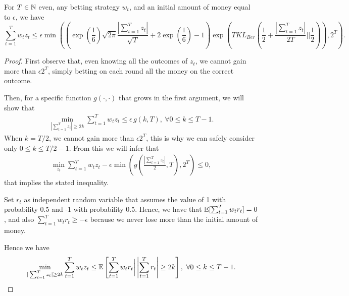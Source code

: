 \begin{theorem}
For $T \in \mathbb{N}$ even, any betting strategy $w_t$, and an initial amount of money equal to $\epsilon$, we have
\[
\sum_{t=1}^T w_t z_t 
\leq \epsilon \min\left(\left(\exp\left(\frac{1}{6}\right)\sqrt{2 \pi}\frac{|\sum_{t=1}^T z_t|}{\sqrt{T}} +2\exp\left(\frac{1}{6}\right)-1\right) \exp\left(T KL_{Ber}(\frac{1}{2}+\frac{|\sum_{t=1}^T z_t|}{2T}||\frac{1}{2})\right), 2^T\right).
\]
\end{theorem}
\begin{proof}
First observe that, even knowing all the outcomes of $z_t$, we cannot gain more than $\epsilon 2^T$, simply betting on each round all the money on the correct outcome.

Then, for a specific function $g(\cdot,\cdot)$ that grows in the first argument, we will show that
\begin{align*}
\min_{|\sum_{t=1}^T z_t| \geq 2 k} \sum_{t=1}^T w_t z_t 
\leq \epsilon \, g(k,T), \ \forall 0 \leq k \leq T-1.
\end{align*}
When $k=T/2$, we cannot gain more than $\epsilon 2^T$, this is why we can safely consider only $0\leq k\leq T/2-1$.
From this we will infer that
\begin{align*}
\min_{z_t} \sum_{t=1}^T w_t z_t - \epsilon\min\left(g\left(\frac{|\sum_{t=1}^T z_t|}{2},T\right),2^T\right) \leq 0,
\end{align*}
that implies the stated inequality.

Set $r_t$ as independent random variable that assumes the value of 1 with probability 0.5 and -1 with probability 0.5.
Hence, we have that $\mathbb{E}[ \sum_{t=1}^T w_t r_t ]=0$, and also $\sum_{t=1}^T w_t r_t \geq -\epsilon$ because we never lose more than the initial amount of money.

Hence we have
\begin{align*}
\min_{|\sum_{t=1}^T z_t| \geq 2 k} \sum_{t=1}^T w_t z_t 
\leq \mathbb{E}\left[\sum_{t=1}^T w_t r_t \bigg| \left|\sum_{t=1}^T r_t\right| \geq 2 k\right], \ \forall 0 \leq k \leq T-1.
\end{align*}


\end{proof}
